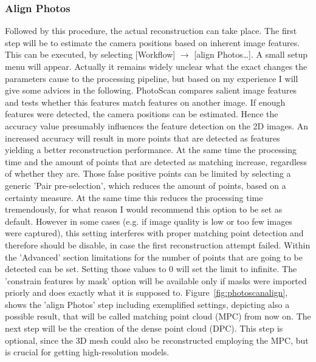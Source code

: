 \documentclass[12pt,a4paper]{scrartcl}
\begin{document}
\subsubsection{Align Photos}
Followed by this procedure, the actual reconstruction can take place. The first step will be to estimate the camera positions based on inherent image features. This can be executed, by selecting [Workflow] $\rightarrow$ [align Photos\dots]. A small setup menu will appear. Actually it remains widely unclear what the exact changes the parameters cause to the processing pipeline, but based on my experience I will give some advices in the following. PhotoScan compares salient image features and tests whether this features match features on another image. If enough features were detected, the camera positions can be estimated. Hence the accuracy value presumably influences the feature detection on the 2D images. An increased accuracy will result in more points that are detected as features yielding a better reconstruction performance. At the same time the processing time and the amount of points that are detected as matching increase, regardless of whether they are. Those false positive points can be limited by selecting a generic 'Pair pre-selection', which reduces the amount of points, based on a certainty measure. At the same time this reduces the processing time tremendously, for what reason I would recommend this option to be set as default. However in some cases (e.g. if image quality is low or too few images were captured), this setting interferes with proper matching point detection and therefore should be disable, in case the first reconstruction attempt failed. Within the 'Advanced' section limitations for the number of points that are going to be detected can be set. Setting those values to 0 will set the limit to infinite. The 'constrain features by mask' option will be available only if masks were imported priorly and does exactly what it is supposed to.
Figure~\ref{fig:photoscanalign}, shows the 'align Photos' step including exemplified settings, depicting also a possible result, that will be called matching point cloud (MPC) from now on.
The next step will be the creation of the dense point cloud (DPC). This step is optional, since the 3D mesh could also be reconstructed employing the MPC, but is crucial for getting high-resolution models.
\end{document}
